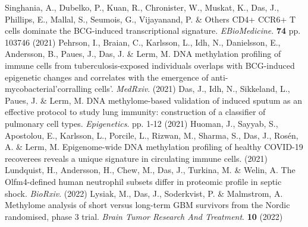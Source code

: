 Singhania, A., Dubelko, P., Kuan, R., Chronister, W., Muskat, K., Das, J., Phillips, E., Mallal, S., Seumois, G., Vijayanand, P. \& Others CD4+ CCR6+ T cells dominate the BCG-induced transcriptional signature. {\em EBioMedicine}. \textbf{74} pp. 103746 (2021)
Pehrson, I., Braian, C., Karlsson, L., Idh, N., Danielsson, E., Andersson, B., Paues, J., Das, J. \& Lerm, M. DNA methylation profiling of immune cells from tuberculosis-exposed individuals overlaps with BCG-induced epigenetic changes and correlates with the emergence of anti-mycobacterial'corralling cells'. {\em MedRxiv}. (2021)
Das, J., Idh, N., Sikkeland, L., Paues, J. \& Lerm, M. DNA methylome-based validation of induced sputum as an effective protocol to study lung immunity: construction of a classifier of pulmonary cell types. {\em Epigenetics}. pp. 1-12 (2021)
Huoman, J., Sayyab, S., Apostolou, E., Karlsson, L., Porcile, L., Rizwan, M., Sharma, S., Das, J., Rosén, A. \& Lerm, M. Epigenome-wide DNA methylation profiling of healthy COVID-19 recoverees reveals a unique signature in circulating immune cells.  (2021)
Lundquist, H., Andersson, H., Chew, M., Das, J., Turkina, M. \& Welin, A. The Olfm4-defined human neutrophil subsets differ in proteomic profile in septic shock. {\em BioRxiv}. (2022)
Lysiak, M., Das, J., Soderkvist, P. \& Malmstrom, A. Methylome analysis of short versus long-term GBM survivors from the Nordic randomised, phase 3 trial. {\em Brain Tumor Research And Treatment}. \textbf{10} (2022)
